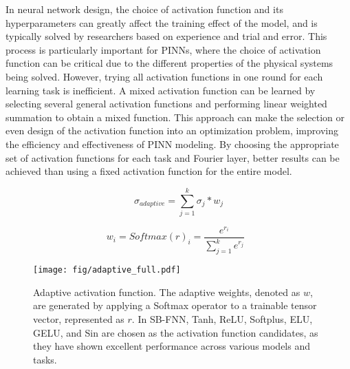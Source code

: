 In neural network design, the choice of activation function and its hyperparameters can greatly affect the training effect of the model, and is typically solved by researchers based on experience and trial and error. This process is particularly important for PINNs, where the choice of activation function can be critical due to the different properties of the physical systems being solved. However, trying all activation functions in one round for each learning task is inefficient. A mixed activation function can be learned by selecting several general activation functions and performing linear weighted summation to obtain a mixed function. This approach can make the selection or even design of the activation function into an optimization problem, improving the efficiency and effectiveness of PINN modeling. By choosing the appropriate set of activation functions for each task and Fourier layer, better results can be achieved than using a fixed activation function for the entire model.

\begin{equation}
\sigma_{adaptive} = \sum_{j=1}^k \sigma_{j} * w_j
\end{equation}

\begin{equation}
w_i=Softmax(r)_i = \frac{e^{r_{i}}}{\sum_{j=1}^k e^{r_{j}}} \ \ \ 
\end{equation}


\begin{figure}[h]
\centering
\texttt{[image: fig/adaptive\_full.pdf]}
\caption[Adaptive activation function] {Adaptive activation function. The adaptive weights, denoted as $w$, are generated by applying a Softmax operator to a trainable tensor vector, represented as $r$. In SB-FNN, Tanh, ReLU, Softplus, ELU, GELU, and Sin are chosen as the activation function candidates, as they have shown excellent performance across various models and tasks.}
\label{fig:adaptive_flow}
\end{figure}

